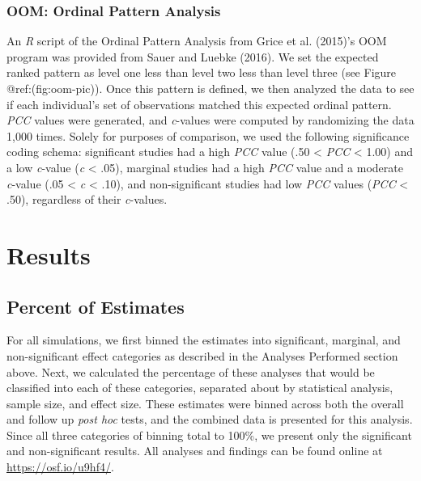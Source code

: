 \documentclass[english,man]{apa6}
\theoremstyle{definition}
\theoremstyle{definition}
\theoremstyle{definition}
\theoremstyle{remark}
\begin{document}
\subsubsection{OOM: Ordinal Pattern
Analysis}\label{oom-ordinal-pattern-analysis}

An \emph{R} script of the Ordinal Pattern Analysis from Grice et al.
(2015)'s OOM program was provided from Sauer and Luebke (2016). We set
the expected ranked pattern as level one less than level two less than
level three (see Figure @ref:(fig:oom-pic)). Once this pattern is
defined, we then analyzed the data to see if each individual's set of
observations matched this expected ordinal pattern. \emph{PCC} values
were generated, and \emph{c}-values were computed by randomizing the
data 1,000 times. Solely for purposes of comparison, we used the
following significance coding schema: significant studies had a high
\emph{PCC} value (.50 \textless{} \emph{PCC} \textless{} 1.00) and a low
\emph{c}-value (\emph{c} \textless{} .05), marginal studies had a high
\emph{PCC} value and a moderate \emph{c}-value (.05 \textless{} \emph{c}
\textless{} .10), and non-significant studies had low \emph{PCC} values
(\emph{PCC} \textless{} .50), regardless of their \emph{c}-values.

\section{Results}\label{results}

\subsection{Percent of Estimates}\label{percent-of-estimates}

For all simulations, we first binned the estimates into significant,
marginal, and non-significant effect categories as described in the
Analyses Performed section above. Next, we calculated the percentage of
these analyses that would be classified into each of these categories,
separated about by statistical analysis, sample size, and effect size.
These estimates were binned across both the overall and follow up
\emph{post hoc} tests, and the combined data is presented for this
analysis. Since all three categories of binning total to 100\%, we
present only the significant and non-significant results. All analyses
and findings can be found online at \url{https://osf.io/u9hf4/}.
\end{document}
